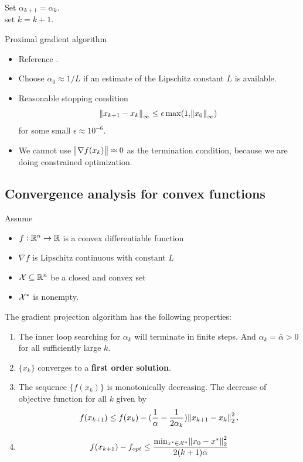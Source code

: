 \begin{refsection}
\begin{algorithm}[H]
{		
		Set $\alpha_{k+1} = \alpha_k$.\\
		set $k = k+1$.
	}
	\caption{Proximal gradient algorithm}
\end{algorithm}	

\begin{remark}\hfill
	\begin{itemize}
		\item Reference \cite{Robinson2015convex}.
		\item Choose $\alpha_0 \approx 1/L$ if an estimate of the Lipschitz constant $L$ is available.
		\item Reasonable stopping condition 
		$$\norm{x_{k+1} - x_k}_\infty \leq \epsilon \max(1,\norm{x_0}_\infty)$$
		for some small $\epsilon \approx 10^{-6}$.
		\item We cannot use $\norm{\nabla f(x_k)} \approx 0$ as the termination condition, because we are doing constrained optimization.
	\end{itemize}
	
\end{remark}

\subsection{Convergence analysis for convex functions}
\begin{theorem}
	Assume
	\begin{itemize}
		\item $f:\mathbb{R}^n\to \mathbb{R}$ is a convex differentiable function
		\item $\nabla f$ is Lipschitz continuous with constant $L$
		\item $\mathcal{X} \subseteq \mathbb{R}^n$ be a closed and convex set
		\item $\mathcal{X}^*$ is nonempty.
	\end{itemize}
	The gradient projection algorithm has the following properties:
	\begin{enumerate}
		\item The inner loop searching for $\alpha_k$ will terminate in finite steps. And $\alpha_k = \bar{\alpha} > 0$ for all sufficiently large $k$.
		\item $\{x_k\}$ converges to a \textbf{first order solution}.
		\item The sequence $\{f(x_k)\}$ is monotonically decreasing. The decrease of objective function for all $k$ given by
		$$f(x_{k+1}) \leq f(x_k) - (\frac{1}{\alpha} - \frac{1}{2\alpha_k})\norm{x_{k+1}-x_k}_2^2.$$
		\item 
		$$f(x_{k+1}) - f_{opt} \leq \frac{\min_{x^*\in \mathcal{X}^*}\norm{x_0 - x^*}_2^2}{2(k+1)\bar{\alpha}}$$	
	\end{enumerate}
\end{theorem}


\end{refsection}
